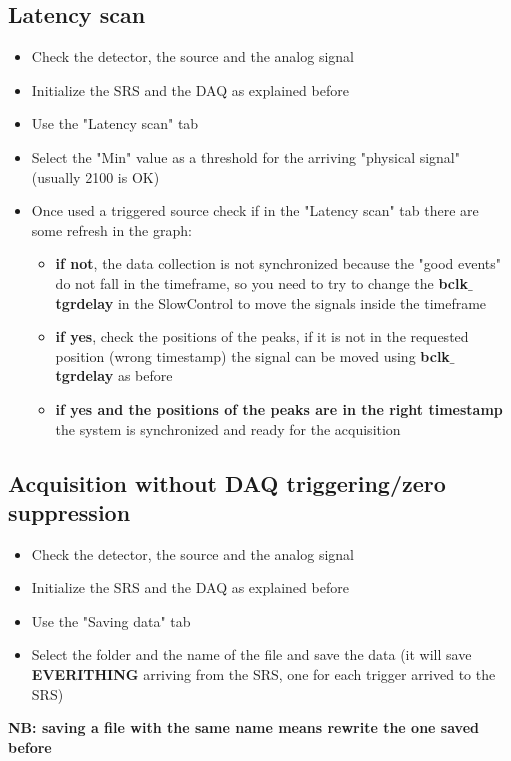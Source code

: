 \documentclass[a4paper,12pt]{article}
\begin{document}
		\subsection{Latency scan}
			\begin{itemize}
				\item Check the detector, the source and the analog signal
				\item Initialize the SRS and the DAQ as explained before
				\item Use the "Latency scan" tab
				\item Select the "Min" value as a threshold for the arriving "physical signal" (usually 2100 is OK)
				\item Once used a triggered source check if in the "Latency scan" tab there are some refresh in the graph:
				\begin{itemize}
				 	\item \textbf{if not}, the data collection is not synchronized because the "good events" do not fall in the timeframe, so you need to try to change the \textbf{bclk$\_$tgrdelay} in the SlowControl to move the signals inside the timeframe 
				 	\item \textbf{if yes}, check the positions of the peaks, if it is not in the requested position (wrong timestamp) the signal can be moved using \textbf{bclk$\_$tgrdelay} as before
				 	\item \textbf{if yes and the positions of the peaks are in the right timestamp} the system is synchronized and ready for the acquisition
				 \end{itemize} 
			\end{itemize}

		\subsection{Acquisition \textbf{without} DAQ triggering/zero suppression}
			\begin{itemize}
				\item Check the detector, the source and the analog signal
				\item Initialize the SRS and the DAQ as explained before
				\item Use the "Saving data" tab
				\item Select the folder and the name of the file and save the data (it will save \textbf{EVERITHING} arriving from the SRS, one for each trigger arrived to the SRS)
			\end{itemize}
			\textbf{NB: saving a file with the same name means rewrite the one saved before}
\end{document}
